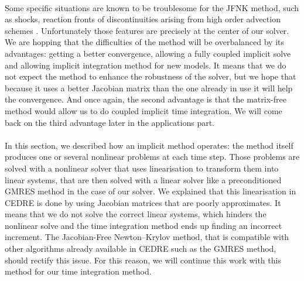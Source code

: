       \paragraph{}
      Some specific situations are known to be troublesome for the JFNK method, such as shocks, reaction fronts of discontinuities arising from high order advection schemes \cite{KnollKeyes2004}.
      Unfortunately those features are precisely at the center of our solver.
      We are hopping that the difficulties of the method will be overbalanced by its advantages: getting a better convergence, allowing a fully coupled implicit solve and allowing implicit integration method for new models.
      It means that we do not expect the method to enhance the robustness of the solver, but we hope that because it uses a better Jacobian matrix than the one already in use it will help the convergence.
      And once again, the second advantage is that the matrix-free method would allow us to do coupled implicit time integration.
      We will come back on the third advantage later in the applications part.


    \paragraph{}
    In this section, we described how an implicit method operates: the method itself produces one or several nonlinear problems at each time step.
    Those problems are solved with a nonlinear solver that uses linearisation to transform them into linear systems, that are then solved with a linear solver like a preconditioned GMRES method in the case of our solver.
    We explained that this linearisation in CEDRE is done by using Jacobian matrices that are poorly approximates.
    It means that we do not solve the correct linear systems, which hinders the nonlinear solve and the time integration method ends up finding an incorrect increment.
    The Jacobian-Free Newton--Krylov method, that is compatible with other algorithms already available in CEDRE such as the GMRES method,  should rectify this issue.
    For this reason, we will continue this work with this method for our time integration method.
